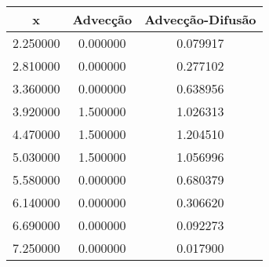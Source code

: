 \begin{tabular}{ccc}
\toprule
x & Advecção & Advecção-Difusão \\
\midrule
2.250000 & 0.000000 & 0.079917 \\
2.810000 & 0.000000 & 0.277102 \\
3.360000 & 0.000000 & 0.638956 \\
3.920000 & 1.500000 & 1.026313 \\
4.470000 & 1.500000 & 1.204510 \\
5.030000 & 1.500000 & 1.056996 \\
5.580000 & 0.000000 & 0.680379 \\
6.140000 & 0.000000 & 0.306620 \\
6.690000 & 0.000000 & 0.092273 \\
7.250000 & 0.000000 & 0.017900 \\
\bottomrule
\end{tabular}
